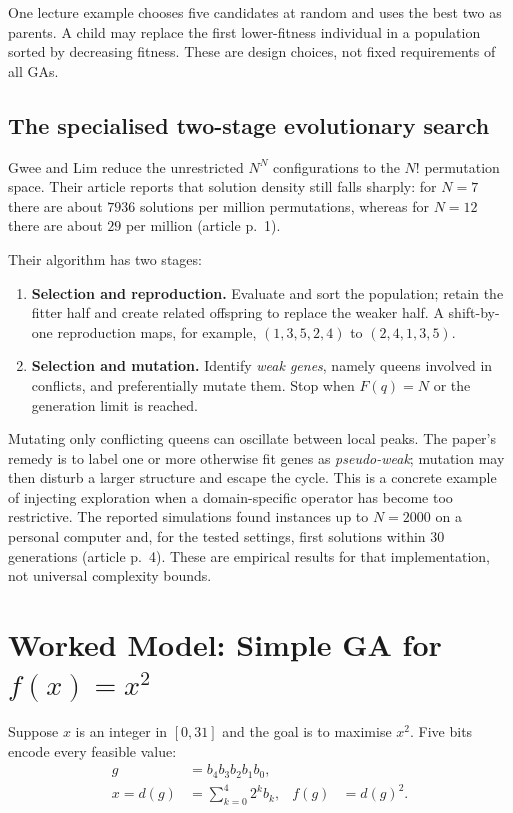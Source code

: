 \documentclass[11pt,a4paper]{article}
\begin{document}
One lecture example chooses five candidates at random and uses the best two as
parents.  A child may replace the first lower-fitness individual in a
population sorted by decreasing fitness.  These are design choices, not fixed
requirements of all GAs.

\subsection{The specialised two-stage evolutionary search}

Gwee and Lim reduce the unrestricted $N^N$ configurations to the $N!$
permutation space.  Their article reports that solution density still falls
sharply: for $N=7$ there are about $7936$ solutions per million permutations,
whereas for $N=12$ there are about $29$ per million (article p.~1).

Their algorithm has two stages:

\begin{enumerate}[leftmargin=*]
  \item \textbf{Selection and reproduction.} Evaluate and sort the
        population; retain the fitter half and create related offspring to
        replace the weaker half.  A shift-by-one reproduction maps, for
        example, $(1,3,5,2,4)$ to $(2,4,1,3,5)$.
  \item \textbf{Selection and mutation.} Identify \emph{weak genes}, namely
        queens involved in conflicts, and preferentially mutate them.  Stop
        when $F(q)=N$ or the generation limit is reached.
\end{enumerate}

Mutating only conflicting queens can oscillate between local peaks.  The
paper's remedy is to label one or more otherwise fit genes as
\emph{pseudo-weak}; mutation may then disturb a larger structure and escape
the cycle.  This is a concrete example of injecting exploration when a
domain-specific operator has become too restrictive.  The reported simulations
found instances up to $N=2000$ on a personal computer and, for the tested
settings, first solutions within 30 generations (article p.~4).  These are
empirical results for that implementation, not universal complexity bounds.

\section{Worked Model: Simple GA for \texorpdfstring{$f(x)=x^2$}{f(x)=x squared}}

Suppose $x$ is an integer in $[0,31]$ and the goal is to maximise $x^2$.
Five bits encode every feasible value:
\[
  \begin{aligned}
    g &= b_4b_3b_2b_1b_0,\\
    x=d(g) &= \sum_{k=0}^{4}2^k b_k,
    & f(g) &= d(g)^2.
  \end{aligned}
\]
\end{document}
